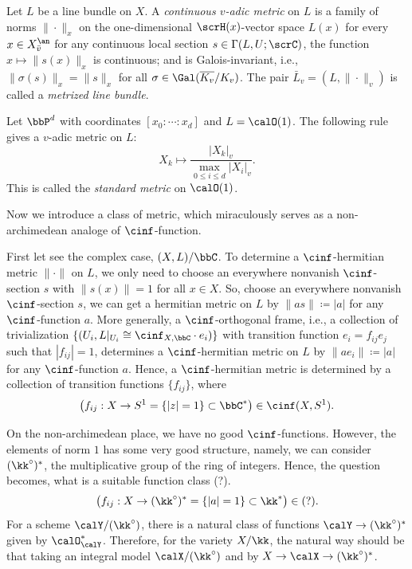 \begin{definition}[label=\labelNFM{def:adic-metric}, status=draft, tag=0000000]
	Let $L$ be a line bundle on $X$.
	A \emph{continuous $v$-adic metric} on $L$ is a family of norms $\|\cdot\|_{x}$ on the one-dimensional $\scrH(x)$-vector space $L(x)$ for every $x \in X_{\bar{v}}^\an$ for any continuous local section $s \in \Gamma(L,U;\scrC)$, the function $x \mapsto \|s(x)\|_x$ is continuous;
	and is Galois-invariant, i.e., $\|\sigma(s)\|_x = \|s\|_x$ for all $\sigma \in \Gal(\overline{K_v}/K_v)$.
	The pair $\bar L_v = (L,\|\cdot\|_v)$ is called a \emph{metrized line bundle}.
\end{definition}

\begin{example}[label=\labelNFM{eg:standard-metrics-on-projective-space}, status=draft, tag=0000000]
	Let $\bbP^d$ with coordinates $[x_0:\cdots:x_d]$ and $L = \calO(1)$.
	The following rule gives a $v$-adic metric on $L$:
	\[ X_k \mapsto \frac{|X_k|_v}{\max_{0 \leq i \leq d}|X_i|_v}. \]
	This is called the \emph{standard metric} on $\calO(1)$.
\end{example}

Now we introduce a class of metric, which miraculously serves as a non-archimedean analoge of $\cinf$-function.

First let see the complex case, $(X,L)/\bbC$.
To determine a $\cinf$-hermitian metric $\|\cdot\|$ on $L$, we only need to choose an everywhere nonvanish $\cinf$-section $s$ with $\|s(x)\| = 1$ for all $x \in X$.
So, choose an everywhere nonvanish $\cinf$-section $s$, we can get a hermitian metric on $L$ by $\|as\| \coloneqq |a|$ for any $\cinf$-function $a$.
More generally, a $\cinf$-orthogonal frame, i.e., a collection of trivialization $\{(U_i,L|_{U_i} \cong \cinf_{X,\bbC} \cdot e_i)\}$ with transition function $e_i = f_{ij} e_j$ such that $|f_{ij}|=1$, determines a $\cinf$-hermitian metric on $L$ by $\|ae_i\| \coloneqq |a|$ for any $\cinf$-function $a$.
Hence, a $\cinf$-hermitian metric is determined by a collection of transition functions $\{f_{ij}\}$, where
\[ \bigl( f_{ij}: X \to S^1 = \{|z|=1\} \subset \bbC^* \bigr) \in \cinf(X,S^1). \]

On the non-archimedean place, we have no good $\cinf$-functions.
However, the elements of norm $1$ has some very good structure, namely, we can consider $(\kk^\circ)^*$, the multiplicative group of the ring of integers.
Hence, the question becomes, what is a suitable function class (?).
\[ \bigl( f_{ij}: X \to (\kk^\circ)^* = \{|a|=1\} \subset \kk^*\bigr) \in (?). \]
For a scheme $\calY/(\kk^\circ)$, there is a natural class of functions $\calY \to (\kk^\circ)^*$ given by $\calO_\calY^*$.
Therefore, for the variety $X/\kk$, the natural way should be that taking an integral model $\calX/(\kk^\circ)$ and by $X \to \calX \to (\kk^\circ)^*$.

